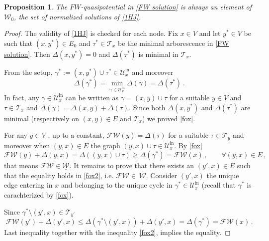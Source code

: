 \documentclass[10pt,a4paper]{amsart}
\newtheorem{proposition}{Proposition}
\newcommand{\upbar}[1]{\,\overline{\! #1}}
\begin{document}
\begin{proposition}\label{propFW}
	The $FW$-quasipotential in \eqref{FW solution} is always an element of $\mathcal W_0$, the set of normalized solutions of \eqref{1HJ}.
\end{proposition}

\begin{proof}
	The validity of \eqref{1HJ} is checked for each node. Fix $x\in V$ and let $y^*\in V$ be such that $(x,y^*)\in E_0$ and $\tau^*\in \mathcal T_x$ be the minimal arborescence in \eqref{FW solution}. Then $\Delta(x,y^*)=0$ and $\Delta(\tau^*)$ is minimal in $\mathcal T_x$. 
	
	From the setup,  $\gamma^*:=(x,y^*)\cup \tau^* \in  \mathcal{U}^{\mathrm{in}}_x$ and moreover 
	\begin{equation}\label{fox}
		\Delta(\gamma^*)=\min_{\gamma\in \mathcal{U}^{\mathrm{in}}_x} \Delta(\gamma)=\Delta(\tau^*)\,.
	\end{equation} 
	In fact,  any $\gamma\in \mathcal{U}^{\mathrm{in}}_x$ can be written as $\gamma=(x,y)\cup \tau$ for a suitable $y\in V$ and $\tau\in \mathcal T_x$ and $\Delta(\gamma)=\Delta(x,y)+\Delta (\tau)$. Since both $\Delta(x,y^*)$ and $\Delta (\tau^*)$ are minimal (respectively on $(x,y)\in E$ and $\mathcal T_x$) we  proved \eqref{fox}.
	
	For any $y\in V$ , up to a constant, $\mathscr{FW}(y)=\Delta(\tau)$ for a suitable $\tau\in \mathcal T_y$ and moreover when $(y,x)\in E$ the graph $(y,x)\cup \tau\in \mathcal{U}^{\mathrm{in}}_x$. By \eqref{fox} 
	\begin{equation}\label{fox2}
		\mathscr{FW}(y)+\Delta(y,x)=\Delta((y,x)\cup \tau)\geq \Delta(\gamma^*)=\mathscr{FW}(x)\,,\qquad \forall (y,x)\in E\,,
	\end{equation}
	that means $\mathscr{FW}\in \underline{\mathcal W}$.
	It remains to prove that there exists an $(y',x)\in E$ such that the equality holds in \eqref{fox2}, i.e. $\mathscr{FW}\in \upbar{\mathcal W}$. Consider $(y',x)$ the unique edge entering in $x$ and belonging to the unique cycle in
	$\gamma^*\in \mathcal{U}^{\mathrm{in}}_x$ (recall that $\gamma^*$ is carachterized by \eqref{fox}). 
	
	Since $\gamma^*\setminus (y',x)\in \mathcal T_{y'}$
	\begin{equation}
		\mathscr{FW}(y')+\Delta(y',x)\leq \Delta(\gamma^*\setminus (y',x))+\Delta(y',x)=\Delta(\gamma^*)=\mathscr{FW}(x)\,.
	\end{equation}
	Last inequality  together with the inequality \eqref{fox2}, implies the equality.
\end{proof}
\end{document}
